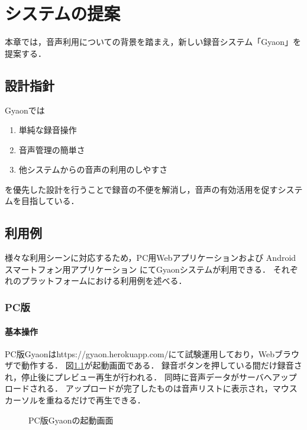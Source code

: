 \chapter{システムの提案}
\label{chap:proposal}

本章では，音声利用についての背景を踏まえ，新しい録音システム「Gyaon」を提案する．

\newpage

\section{設計指針}

Gyaonでは
\begin{enumerate}
\item 単純な録音操作
\item 音声管理の簡単さ
\item 他システムからの音声の利用のしやすさ
\end{enumerate}
を優先した設計を行うことで録音の不便を解消し，音声の有効活用を促すシステムを目指している．

\section{利用例}
様々な利用シーンに対応するため，PC用Webアプリケーションおよび
Androidスマートフォン用アプリケーション
にてGyaonシステムが利用できる．
それぞれのプラットフォームにおける利用例を述べる．

\subsection{PC版}

\subsubsection{基本操作}
PC版Gyaonはhttps://gyaon.herokuapp.com/にて試験運用しており，Webブラウザで動作する．
図\ref{gyaon}が起動画面である．
録音ボタンを押している間だけ録音され，停止後にプレビュー再生が行われる．
同時に音声データがサーバへアップロードされる．
アップロードが完了したものは音声リストに表示され，マウスカーソルを重ねるだけで再生できる．

\begin{figure}[H]
\centering
{}
\caption{PC版Gyaonの起動画面}
\label{gyaon}
\end{figure}


